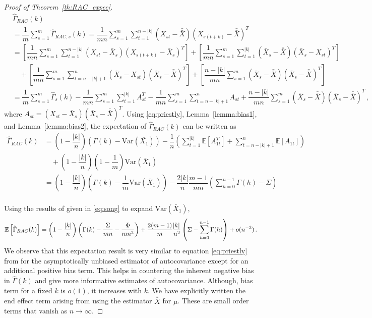\documentclass[12pt]{article}
\newcommand{\Var}{\text{Var}}
\theoremstyle{remark}
\begin{document}
\begin{proof}[Proof of Theorem~\ref{th:RAC_expec}]
\begin{align*}
    & \hat{\Gamma}_{RAC}(k) \\
    &= \dfrac{1}{m}\sum_{s=1}^{m}\hat{\Gamma}_{RAC,s}(k) = \dfrac{1}{mn}\sum_{s=1}^{m}\sum_{t=1}^{n-|k|} \left(X_{st} - \bar{\bar{X}} \right) \left(X_{s(t+k)} - \bar{\bar{X}} \right)^T\\
    &= \left[\dfrac{1}{mn}\sum_{s=1}^{m}\sum_{t=1}^{n-|k|} \left(X_{st} - \bar{X}_s \right) \left(X_{s(t+k)} - \bar{X}_s \right)^T \right] + \left[\dfrac{1}{mn}\sum_{s=1}^{m}\sum_{t=1}^{|k|} \left(\bar{X}_s - \bar{\bar{X}} \right)  \left(\bar{X}_s - X_{st} \right)^T\right]\\ 
    & \quad +  \left[\dfrac{1}{mn}\sum_{s=1}^{m}\sum_{t=n-|k|+1}^{n}  \left( \bar{X}_s - X_{st} \right)  \left(\bar{X}_s - \bar{\bar{X}} \right)^T\right] + \left[\dfrac{n-|k|}{mn}\sum_{s=1}^{m}  \left(\bar{X}_s - \bar{\bar{X}}\right)   \left(\bar{X}_s - \bar{\bar{X}} \right)^T\right]\\
    &= \dfrac{1}{m}\sum_{s=1}^{m}\hat{\Gamma}_s(k) - \dfrac{1}{mn}\sum_{s=1}^{m}\sum_{t=1}^{|k|}A_{st}^T - \dfrac{1}{mn}\sum_{s=1}^{m}\sum_{t=n-|k|+1}^{n}A_{st} + \dfrac{n-|k|}{mn}\sum_{s=1}^{m}  \left(\bar{X}_s - \bar{\bar{X}} \right)  \left(\bar{X}_s - \bar{\bar{X}} \right)^T\,,
\end{align*}
%
where $A_{st} = (X_{st}-\bar{X}_s)(\bar{X}_s - \bar{\bar{X}})^T$. Using \eqref{eq:priestly}, Lemma~\ref{lemma:bias1}, and Lemma~\ref{lemma:bias2}, the expectation of $\hat{\Gamma}_{RAC}(k)$ can be written as 
%
\begin{align*}
\hat{\Gamma}_{RAC}(k) &= \left(1- \dfrac{|k|}{n}\right) \left(\Gamma(k) - \Var(\overline{X_1})\right) - \dfrac{1}{n} \left(\sum\limits_{t=1}^{|k|}\mathbb{E}[A_{1t}^T] + \sum\limits_{t=n-|k|+1}^{n}\mathbb{E}[A_{1t}]\right)\\
    & \quad  + \left(1- \dfrac{|k|}{n}\right)\left(1-\dfrac{1}{m}\right)\Var(\bar{X}_1)\\
    &= \left(1- \dfrac{|k|}{n}\right)\left(\Gamma(k) - \dfrac{1}{m}\Var(\bar{X}_1)\right) - \dfrac{2|k|}{n}\dfrac{m-1}{mn}\left(\sum_{h=0}^{n-1}\Gamma(h) - \Sigma\right)
\end{align*}
\\
Using the results of \cite{song1995optimal} given in \eqref{eq:song} to expand $\Var(\bar{X}_1)$,
\[
\mathbb{E}\left[\hat{\Gamma}_{RAC}(k)\right] = \left(1- \dfrac{|k|}{n}\right)\left(\Gamma(k) - \dfrac{\Sigma}{mn} - \dfrac{\Phi}{mn^2}\right)  + \dfrac{2(m-1)}{m}\dfrac{\abs{k}}{n^2} \left(\Sigma - \sum_{h=0}^{n-1}\Gamma(h)\right) + o(n^{-2})\,.
\]
%
We observe that this expectation result is very similar to equation \ref{eq:priestly} from \cite{priestley1981spectral} for the asymptotically unbiased estimator of autocovariance except for an additional positive bias term. This helps in countering the inherent negative bias in $\hat{\Gamma}(k)$ and give more informative estimates of autocovariance.  Although, bias term for a fixed $k$ is $o(1)$, it increases with $k$. We have explicitly written the end effect term arising from using the estimator $\bar{\bar{X}}$ for $\mu$. These are small order terms that vanish as $n \to \infty$.
\end{proof}
\end{document}
